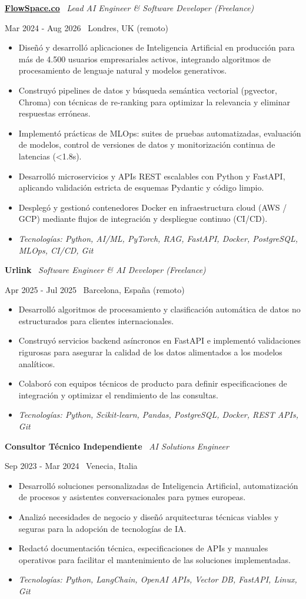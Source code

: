 \documentclass[a4paper,10pt]{article}
\newcommand{\role}[4]{%
  \vspace{2pt}\noindent
  \begin{minipage}[t]{0.70\textwidth}\raggedright\textbf{#1} \textbullet\ \textit{#3}\end{minipage}%
  \hfill
  \begin{minipage}[t]{0.28\textwidth}\raggedleft\footnotesize\color{gray}#2 \textbullet\ #4\end{minipage}%
  \vspace{1pt}%
}
\begin{document}
\role{\href{https://flowspace.co}{FlowSpace.co}}{Mar 2024 - Aug 2026}{Lead AI Engineer \& Software Developer (Freelance)}{Londres, UK (remoto)}
\begin{itemize}
  \item Diseñó y desarrolló aplicaciones de Inteligencia Artificial en producción para más de 4.500 usuarios empresariales activos, integrando algoritmos de procesamiento de lenguaje natural y modelos generativos.
  \item Construyó pipelines de datos y búsqueda semántica vectorial (pgvector, Chroma) con técnicas de re-ranking para optimizar la relevancia y eliminar respuestas erróneas.
  \item Implementó prácticas de MLOps: suites de pruebas automatizadas, evaluación de modelos, control de versiones de datos y monitorización continua de latencias (<1.8s).
  \item Desarrolló microservicios y APIs REST escalables con Python y FastAPI, aplicando validación estricta de esquemas Pydantic y código limpio.
  \item Desplegó y gestionó contenedores Docker en infraestructura cloud (AWS / GCP) mediante flujos de integración y despliegue continuo (CI/CD).
  \item \textit{Tecnologías: Python, AI/ML, PyTorch, RAG, FastAPI, Docker, PostgreSQL, MLOps, CI/CD, Git}
\end{itemize}

\role{Urlink}{Apr 2025 - Jul 2025}{Software Engineer \& AI Developer (Freelance)}{Barcelona, España (remoto)}
\begin{itemize}
  \item Desarrolló algoritmos de procesamiento y clasificación automática de datos no estructurados para clientes internacionales.
  \item Construyó servicios backend asíncronos en FastAPI e implementó validaciones rigurosas para asegurar la calidad de los datos alimentados a los modelos analíticos.
  \item Colaboró con equipos técnicos de producto para definir especificaciones de integración y optimizar el rendimiento de las consultas.
  \item \textit{Tecnologías: Python, Scikit-learn, Pandas, PostgreSQL, Docker, REST APIs, Git}
\end{itemize}

\role{Consultor Técnico Independiente}{Sep 2023 - Mar 2024}{AI Solutions Engineer}{Venecia, Italia}
\begin{itemize}
  \item Desarrolló soluciones personalizadas de Inteligencia Artificial, automatización de procesos y asistentes conversacionales para pymes europeas.
  \item Analizó necesidades de negocio y diseñó arquitecturas técnicas viables y seguras para la adopción de tecnologías de IA.
  \item Redactó documentación técnica, especificaciones de APIs y manuales operativos para facilitar el mantenimiento de las soluciones implementadas.
  \item \textit{Tecnologías: Python, LangChain, OpenAI APIs, Vector DB, FastAPI, Linux, Git}
\end{itemize}
\end{document}
